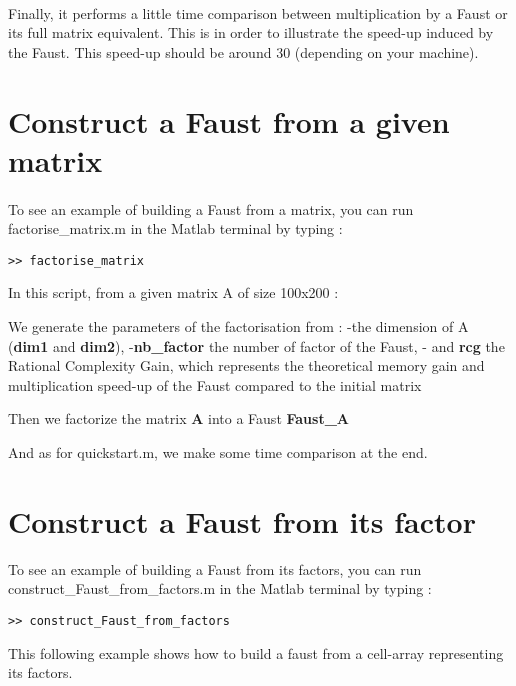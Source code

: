 

\paragraph{}Finally, it performs a little time comparison between multiplication by a Faust or its full matrix equivalent.
This is in order to illustrate the speed-up induced by the Faust. This speed-up should be around 30 (depending on your machine).
%

\newpage
\section{Construct a Faust from a given matrix}\label{sec:firstUseBuildFromMatrix}
\paragraph{} To see an example of building a Faust from a matrix, you can run factorise\_matrix.m in the Matlab terminal by typing :
\begin{lstlisting}
>> factorise_matrix
\end{lstlisting}
In this script, from a given matrix A of size 100x200 :

We generate the parameters of the factorisation from :\newline
-the dimension of A (\textbf{dim1} and \textbf{dim2}),\newline
-\textbf{nb\_factor} the number of factor of the Faust,\newline
- and \textbf{rcg} the Rational Complexity Gain, which represents the theoretical memory gain and multiplication speed-up of the Faust compared to the initial matrix 

Then we factorize the matrix \textbf{A} into a Faust \textbf{Faust\_A}

And as for quickstart.m, we make some time comparison at the end.

\newpage
\section{Construct a Faust from its factor}\label{sec:firstUseBuildFactors}
To see an example of building a Faust from its factors, you can run construct\_Faust\_from\_factors.m in the Matlab terminal by typing :
\begin{lstlisting}
>> construct_Faust_from_factors
\end{lstlisting}
This following example shows how to build a faust from a cell-array representing its factors.



 
